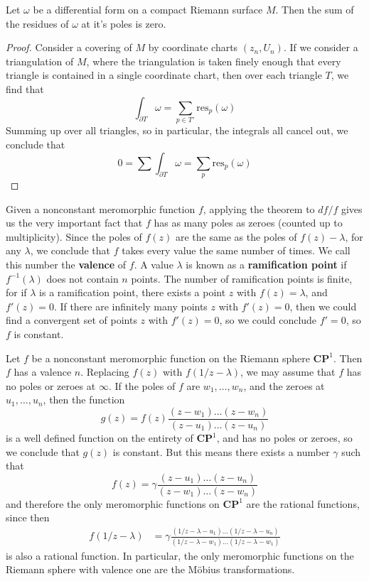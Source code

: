 \begin{theorem}
    Let $\omega$ be a differential form on a compact Riemann surface $M$. Then the sum of the residues of $\omega$ at it's poles is zero.
\end{theorem}
\begin{proof}
    Consider a covering of $M$ by coordinate charts $(z_n, U_n)$. If we consider a triangulation of $M$, where the triangulation is taken finely enough that every triangle is contained in a single coordinate chart, then over each triangle $T$, we find that
    \[ \int_{\partial T} \omega = \sum_{p \in T^\circ} \text{res}_p(\omega) \]
    Summing up over all triangles, so in particular, the integrals all cancel out, we conclude that
    \[ 0 = \sum \int_{\partial T} \omega = \sum_p \text{res}_p(\omega) \]
\end{proof}

Given a nonconstant meromorphic function $f$, applying the theorem to $df/f$ gives us the very important fact that $f$ has as many poles as zeroes (counted up to multiplicity). Since the poles of $f(z)$ are the same as the poles of $f(z) - \lambda$, for any $\lambda$, we conclude that $f$ takes every value the same number of times. We call this number the {\bf valence} of $f$. A value $\lambda$ is known as a {\bf ramification point} if $f^{-1}(\lambda)$ does not contain $n$ points. The number of ramification points is finite, for if $\lambda$ is a ramification point, there exists a point $z$ with $f(z) = \lambda$, and $f'(z) = 0$. If there are infinitely many points $z$ with $f'(z) = 0$, then we could find a convergent set of points $z$ with $f'(z) = 0$, so we could conclude $f' = 0$, so $f$ is constant.

\begin{example}
    Let $f$ be a nonconstant meromorphic function on the Riemann sphere $\mathbf{CP}^1$. Then $f$ has a valence $n$. Replacing $f(z)$ with $f(1/z - \lambda)$, we may assume that $f$ has no poles or zeroes at $\infty$. If the poles of $f$ are $w_1, \dots, w_n$, and the zeroes at $u_1, \dots, u_n$, then the function
    \[ g(z) = f(z) \frac{(z - w_1) \dots (z - w_n)}{(z - u_1) \dots (z - u_n)} \]
    is a well defined function on the entirety of $\mathbf{CP}^1$, and has no poles or zeroes, so we conclude that $g(z)$ is constant. But this means there exists a number $\gamma$ such that
    \[ f(z) = \gamma \frac{(z - u_1) \dots (z - u_n)}{(z - w_1) \dots (z - w_n)} \]
    and therefore the only meromorphic functions on $\mathbf{CP}^1$ are the rational functions, since then
    \begin{align*}
        f(1/z - \lambda) &= \gamma \frac{(1/z - \lambda - u_1) \dots (1/z - \lambda - u_n)}{(1/z - \lambda - w_1) \dots (1/z - \lambda - w_1)}
    \end{align*}
    is also a rational function. In particular, the only meromorphic functions on the Riemann sphere with valence one are the M\"{o}bius transformations.
\end{example}

